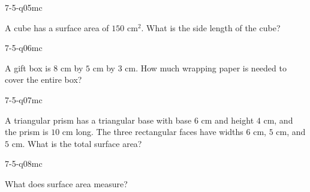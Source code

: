 \begin{practiceQuestion}{7-5-q05}{mc}
\begin{questionText}
A cube has a surface area of $150$ cm$^2$. What is the side length of the cube?
\end{questionText}
\end{practiceQuestion}

\begin{practiceQuestion}{7-5-q06}{mc}
\begin{questionText}
A gift box is $8$ cm by $5$ cm by $3$ cm. How much wrapping paper is needed to cover the entire box?
\end{questionText}
\end{practiceQuestion}

\begin{practiceQuestion}{7-5-q07}{mc}
\begin{questionText}
A triangular prism has a triangular base with base $6$ cm and height $4$ cm, and the prism is $10$ cm long. The three rectangular faces have widths $6$ cm, $5$ cm, and $5$ cm. What is the total surface area?
\end{questionText}
\end{practiceQuestion}

\begin{practiceQuestion}{7-5-q08}{mc}
\begin{questionText}
What does surface area measure?
\end{questionText}
\end{practiceQuestion}

